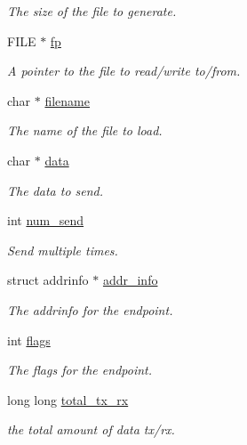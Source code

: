 \begin{DoxyCompactItemize}
\begin{DoxyCompactList}\small\item\em The size of the file to generate. \end{DoxyCompactList}\item 
F\-I\-L\-E $\ast$ \hyperlink{structtb__listener__t_aa065f30aa9f5f9a42132c82c787ee70b}{fp}
\begin{DoxyCompactList}\small\item\em A pointer to the file to read/write to/from. \end{DoxyCompactList}\item 
char $\ast$ \hyperlink{structtb__listener__t_aeac90097f29f7529968697163cea5c18}{filename}
\begin{DoxyCompactList}\small\item\em The name of the file to load. \end{DoxyCompactList}\item 
char $\ast$ \hyperlink{structtb__listener__t_a91a70b77df95bd8b0830b49a094c2acb}{data}
\begin{DoxyCompactList}\small\item\em The data to send. \end{DoxyCompactList}\item 
int \hyperlink{structtb__listener__t_a875fd564b2b2de100e6fc2090a06812c}{num\-\_\-send}
\begin{DoxyCompactList}\small\item\em Send multiple times. \end{DoxyCompactList}\item 
struct addrinfo $\ast$ \hyperlink{structtb__listener__t_aab742bc33815bd69bf49ad1861006b97}{addr\-\_\-info}
\begin{DoxyCompactList}\small\item\em The addrinfo for the endpoint. \end{DoxyCompactList}\item 
int \hyperlink{structtb__listener__t_ac8bf36fe0577cba66bccda3a6f7e80a4}{flags}
\begin{DoxyCompactList}\small\item\em The flags for the endpoint. \end{DoxyCompactList}\item 
long long \hyperlink{structtb__listener__t_af6b56edb73bc2df2c5b45cb794532ce5}{total\-\_\-tx\-\_\-rx}
\begin{DoxyCompactList}\small\item\em the total amount of data tx/rx. \end{DoxyCompactList}\item 

\end{DoxyCompactItemize}
